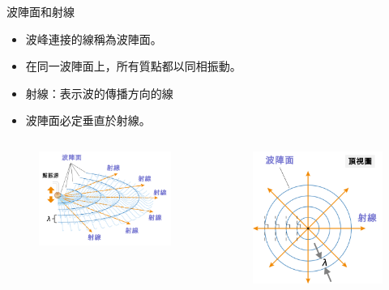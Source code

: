 \documentclass[13pt]{beamer}
\begin{document}
\begin{frame}{波陣面和射線}
    \begin{itemize}
        \item 波峰連接的線稱為波陣面。
        \item 在同一波陣面上，所有質點都以同相振動。
        \item 射線：表示波的傳播方向的線
        \item 波陣面必定垂直於射線。
    \end{itemize}\bigskip
    \begin{columns}
        \begin{figure}
            \centering
            \includegraphics[width=\linewidth]{images/1}

        \end{figure}


        \begin{figure}
            \centering
            \includegraphics[width=0.7\linewidth]{images/2.png}


\end{figure}
\end{columns}
\end{frame}
\end{document}
